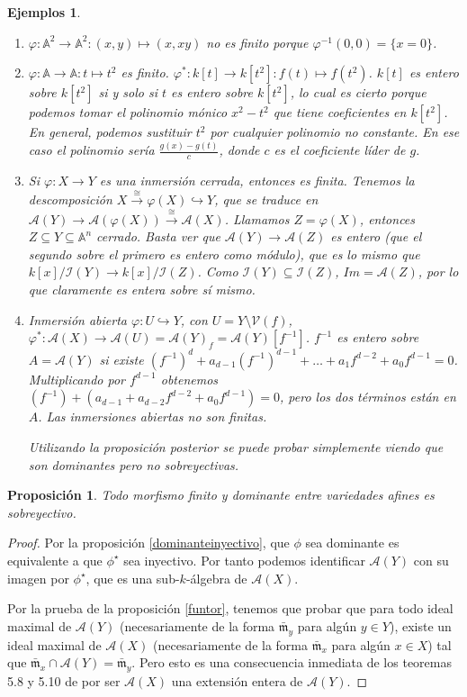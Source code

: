 \documentclass[a4paper,10pt]{book}
\newtheorem{prop}[thm]{Proposición}
\newtheorem{eje}[thm]{Ejemplos}
\newcommand{\calA}{{\mathcal A}}
\newcommand{\VV}{{\mathcal V}}
\newcommand{\mm}{{\mathfrak m}}
\begin{document}
\begin{eje}
\begin{enumerate}
\item $\varphi:\mathbb{A}^2\to\mathbb{A}^2:(x,y)\mapsto(x,xy)$ no es finito porque $\varphi^{-1}(0,0)=\{x=0\}$.
\item $\varphi:\mathbb{A}\to\mathbb{A}:t\mapsto t^2$ es finito. $\varphi^*:k[t]\to k[t^2]:f(t)\mapsto f(t^2)$. $k[t]$ es entero sobre $k[t^2]$ si y solo si $t$ es entero sobre $k[t^2]$, lo cual es cierto porque podemos tomar el polinomio mónico $x^2-t^2$ que tiene coeficientes en $k[t^2]$. En general, podemos sustituir $t^2$ por cualquier polinomio no constante. En ese caso el polinomio sería $\frac{g(x)-g(t)}{c}$, donde $c$ es el coeficiente líder de $g$. 
\item Si $\varphi:X\to Y$ es una inmersión cerrada, entonces es finita. Tenemos la descomposición $X\overset{\cong}{\to}\varphi(X)\hookrightarrow Y$, que se traduce en $\mathcal{A}(Y)\to\mathcal{A}(\varphi(X))\overset{\cong}{\to}\mathcal{A}(X)$. Llamamos $Z=\varphi(X)$, entonces $Z\subseteq Y\subseteq\mathbb{A}^n$ cerrado. Basta ver que $\mathcal{A}(Y)\to\mathcal{A}(Z)$ es entero (que el segundo sobre el primero es entero como módulo), que es lo mismo que $k[x]/\mathcal{I}(Y)\to k[x]/\mathcal{I}(Z)$. Como $\mathcal{I}(Y)\subseteq\mathcal{I}(Z)$, $Im =\mathcal{A}(Z)$, por lo que claramente es entera sobre sí mismo.
\item Inmersión abierta $\varphi:U\hookrightarrow Y$, con $U=Y\setminus\VV(f)$, $\varphi^*:\mathcal{A}(X)\to\mathcal{A}(U)=\mathcal{A}(Y)_f=\mathcal{A}(Y)[f^{-1}]$. $f^{-1}$ es entero sobre $A=\mathcal{A}(Y)$ si existe $(f^{-1})^d +a_{d-1}(f^{-1})^{d-1}+\dots+a_1f^{d-2} + a_0f^{d-1}=0$. Multiplicando por $f^{d-1}$ obtenemos $(f^{-1})+(a_{d-1}+a_{d-2}f^{d-2}+a_0f^{d-1})=0$, pero los dos términos están en $A$. Las inmersiones abiertas no son finitas.

Utilizando la proposición posterior se puede probar simplemente viendo que son dominantes pero no sobreyectivas.
\end{enumerate}
\end{eje}
\begin{prop}
 Todo morfismo finito y dominante entre variedades afines es sobreyectivo.
\end{prop}

\begin{proof}

 Por la proposición \ref{dominanteinyectivo}, que $\phi$ sea dominante es equivalente a que $\phi^\star$ sea inyectivo. Por tanto podemos identificar $\calA(Y)$ con su imagen por $\phi^\star$, que es una sub-$k$-álgebra de $\calA(X)$. 

 Por la prueba de la proposición \ref{funtor}, tenemos que probar que para todo ideal maximal de $\calA(Y)$ (necesariamente de la forma $\bar\mm_y$ para algún $y\in Y$), existe un ideal maximal de $\calA(X)$ (necesariamente de la forma $\bar\mm_x$ para algún $x\in X$) tal que $\bar\mm_x\cap \calA(Y)=\bar\mm_y$. Pero esto es una consecuencia inmediata de los teoremas 5.8 y 5.10 de \cite{am} por ser $\calA(X)$ una extensión entera de $\calA(Y)$. 
\end{proof}
\end{document}
